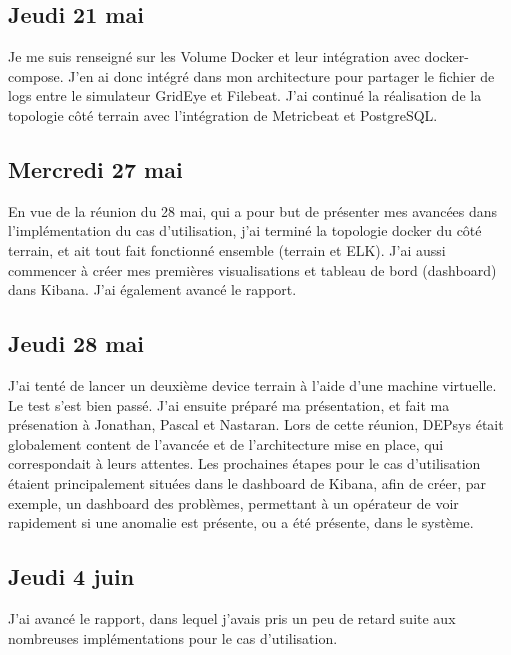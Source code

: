 \documentclass[paper=a4, fontsize=11pt]{scrartcl}
\begin{document}
\subsection{Jeudi 21 mai}
    Je me suis renseigné sur les Volume Docker et leur intégration avec docker-compose. J'en ai donc intégré dans mon architecture pour partager le fichier de logs entre le simulateur GridEye et Filebeat. J'ai continué la réalisation de la topologie côté terrain avec l'intégration de Metricbeat et PostgreSQL.
\subsection{Mercredi 27 mai}
    En vue de la réunion du 28 mai, qui a pour but de présenter mes avancées dans l'implémentation du cas d'utilisation, j'ai terminé la topologie docker du côté terrain, et ait tout fait fonctionné ensemble (terrain et ELK). J'ai aussi commencer à créer mes premières visualisations et tableau de bord (dashboard) dans Kibana. J'ai également avancé le rapport.
\subsection{Jeudi 28 mai}
    J'ai tenté de lancer un deuxième \og device terrain \fg à l'aide d'une machine virtuelle. Le test s'est bien passé. J'ai ensuite préparé ma présentation, et fait ma présenation à Jonathan, Pascal et Nastaran. Lors de cette réunion, DEPsys était globalement content de l'avancée et de l'architecture mise en place, qui correspondait à leurs attentes. Les prochaines étapes pour le cas d'utilisation étaient principalement situées dans le dashboard de Kibana, afin de créer, par exemple, un dashboard des problèmes, permettant à un opérateur de voir rapidement si une anomalie est présente, ou a été présente, dans le système.
\subsection{Jeudi 4 juin}
    J'ai avancé le rapport, dans lequel j'avais pris un peu de retard suite aux nombreuses implémentations pour le cas d'utilisation.
\end{document}
